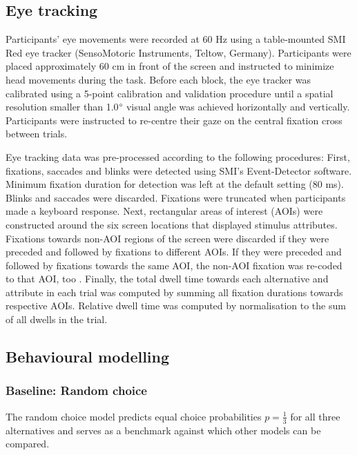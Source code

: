 \documentclass[11pt, a4paper]{article}
\begin{document}
\subsection*{Eye tracking}
\label{sec:methods:eye-tracking}

Participants’ eye movements were recorded at 60 Hz using a table-mounted SMI Red eye tracker (SensoMotoric Instruments, Teltow, Germany). Participants were placed approximately 60 cm in front of the screen and instructed to minimize head movements during the task. Before each block, the eye tracker was calibrated using a 5-point calibration and validation procedure until a spatial resolution smaller than 1.0$\degree$ visual angle was achieved horizontally and vertically. Participants were instructed to re-centre their gaze on the central fixation cross between trials.

Eye tracking data was pre-processed according to the following procedures: First, fixations, saccades and blinks were detected using SMI’s Event-Detector software. Minimum fixation duration for detection was left at the default setting (80 ms). Blinks and saccades were discarded. Fixations were truncated when participants made a keyboard response. Next, rectangular areas of interest (AOIs) were constructed around the six screen locations that displayed stimulus attributes. Fixations towards non-AOI regions of the screen were discarded if they were preceded and followed by fixations to different AOIs. If they were preceded and followed by fixations towards the same AOI, the non-AOI fixation was re-coded to that AOI, too \autocite{krajbich2010VisualFixationsComputation,krajbich2011MultialternativeDriftdiffusionModel}. Finally, the total dwell time towards each alternative and attribute in each trial was computed by summing all fixation durations towards respective AOIs. Relative dwell time was computed by normalisation to the sum of all dwells in the trial.

\subsection*{Behavioural modelling}
\label{sec:methods:behavioural-modelling}

\subsubsection*{Baseline: Random choice}

The random choice model predicts equal choice probabilities $p=\frac{1}{3}$ for all three alternatives and serves as a benchmark against which other models can be compared.
\end{document}
